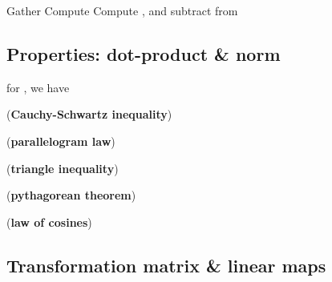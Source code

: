 \begin{itemize}
\begin{itemize}
                        \begin{enumerate}
                              \vItem
                                    Gather
                              \vItem
                                    Compute
                              \vItem
                                    Compute , and
                                    subtract from 
                        \end{enumerate}
            \end{itemize}
\end{itemize}

\subsection*{Properties: dot-product \& norm}



for , we have

(\textbf{Cauchy-Schwartz inequality})

(\textbf{parallelogram law})

(\textbf{triangle inequality})

(\textbf{pythagorean theorem})

(\textbf{law of cosines})

\subsection*{Transformation matrix \& linear maps}


